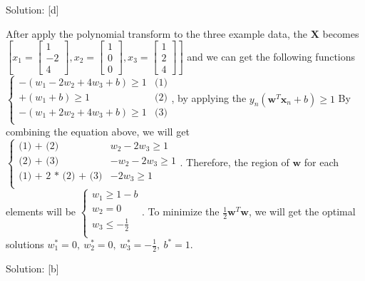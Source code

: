 \documentclass{../../Latex_Template/Homework/homework}
\begin{document}
\maketitle

\question
Solution: [d]

After apply the polynomial transform to the three example data, the $\mathbf{X}$
becomes $[ x_{1} = \begin{bmatrix} 1 \\ -2 \\ 4 \end{bmatrix}, x_{2} =
\begin{bmatrix} 1 \\ 0 \\ 0 \end{bmatrix}, x_{3} = \begin{bmatrix} 1 \\ 2 \\
4 \end{bmatrix} ]$ and we can get the following functions
$
\left\{
	\begin{array}{ll}
    -(w_{1} - 2w_{2} + 4w_{3} + b) \geq 1 & \mbox{(1)} \\
		+(w_{1} + b) \geq 1 & \mbox{(2)} \\
		-(w_{1} + 2w_{2} + 4w_{3} + b) \geq 1 & \mbox{(3)} \\
 	\end{array}
\right.
$,
by applying the $y_{n}(\mathbf{w}^{T}\mathbf{x}_{n} + b) \geq 1$ By combining
the equation above, we will get
$
\left\{
	\begin{array}{ll}
    \mbox{(1) + (2)} & w_{2} - 2w_{3} \geq 1 \\
    \mbox{(2) + (3)} & -w_{2} - 2w_{3} \geq 1 \\
    \mbox{(1) + 2 * (2) + (3)} & - 2w_{3} \geq 1 \\
 	\end{array}
\right.
$.
Therefore, the region of $\mathbf{w}$ for each elements will be
$
\left\{
	\begin{array}{ll}
    w_{1} \geq 1 - b \\
    w_{2} = 0 \\
    w_{3} \leq - \frac{1}{2} \\
 	\end{array}
\right.
$.
To minimize the $\frac{1}{2} \mathbf{w}^{T} \mathbf{w}$, we will get the
optimal solutions $w_{1}^{*} = 0, \ w_{2}^{*} = 0, \ w_{3}^{*} = - \frac{1}{2}
, \ b^{*} = 1$.


\question
Solution: [b]
\end{document}
